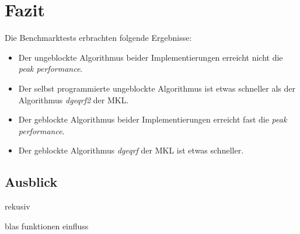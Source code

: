 \newpage
\section{Fazit}
Die Benchmarktests erbrachten folgende Ergebnisse:
\begin{itemize}
	\item Der ungeblockte Algorithmus beider Implementierungen erreicht nicht die \textit{peak performance}.
	\item Der selbst programmierte ungeblockte Algorithmus ist etwas schneller als der Algorithmus \textit{dgeqrf2} der MKL.
	\item Der geblockte Algorithmus beider Implementierungen erreicht fast die \textit{peak performance}.
	\item Der geblockte Algorithmus \textit{dgeqrf} der MKL ist etwas schneller.
\end{itemize}


\subsection{Ausblick}

 rekusiv

blas funktionen einfluss










   
